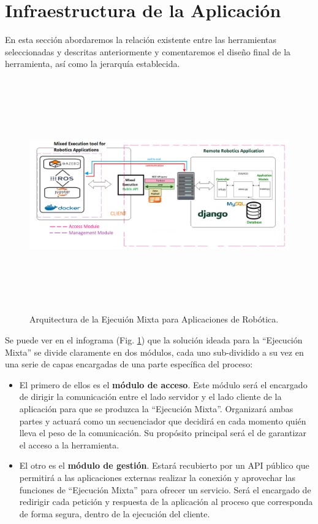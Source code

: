 \section{Infraestructura de la Aplicación}

En esta sección abordaremos la relación existente entre las herramientas seleccionadas y descritas anteriormente y comentaremos el diseño final de la herramienta, así como la jerarquía establecida.

\begin{figure}[!ht]  \centering\noindent
    \includegraphics[width=1.20\textwidth,height=10cm]{figures/ejecucion-mixta-infograma.png}
    \caption{Arquitectura de la Ejecuión Mixta para Aplicaciones de Robótica.}
    \label{mixedexecarch}
\end{figure}

Se puede ver en el infograma (Fig. \ref{mixedexecarch}) que la solución ideada para la ``Ejecución Mixta'' se divide claramente en dos módulos, cada uno sub-dividido a su vez en una serie de capas encargadas de una parte específica del proceso:

\begin{itemize}
    \item [\textbullet] El primero de ellos es el \textbf{módulo de acceso}. Este módulo será el encargado de dirigir la comunicación entre el lado servidor y el lado cliente de la aplicación para que se produzca la ``Ejecución Mixta''. Organizará ambas partes y actuará como un secuenciador que decidirá en cada momento quién lleva el peso de la comunicación. Su propósito principal será el de garantizar el acceso a la herramienta.
    \item [\textbullet] El otro es el \textbf{módulo de gestión}. Estará recubierto por un API público que permitirá a las aplicaciones externas realizar la conexión y aprovechar las funciones de ``Ejecución Mixta'' para ofrecer un servicio. Será el encargado de redirigir cada petición y respuesta de la aplicación al proceso que corresponda de forma segura, dentro de la ejecución del cliente.
\end{itemize}

